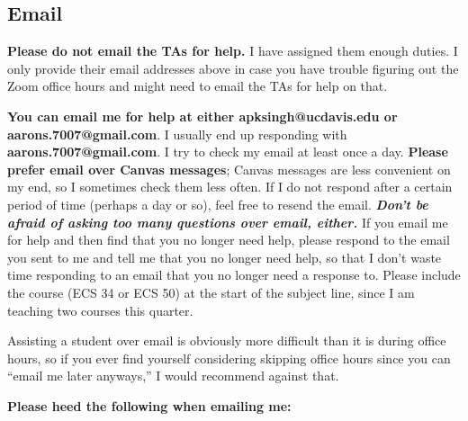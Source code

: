 \documentclass{article}
\begin{document}
\subsection{Email}

\textbf{Please do not email the TAs for help.} I have assigned them enough duties. I only provide their email addresses above in case you have trouble figuring out the Zoom office hours and might need to email the TAs for help on that.

\textbf{You can email me for help at either \textbf{apksingh@ucdavis.edu} or \textbf{aarons.7007@gmail.com}}. I usually end up responding with \textbf{aarons.7007@gmail.com}. I try to check my email at least once a day. \textbf{Please prefer email over Canvas messages}; Canvas messages are less convenient on my end, so I sometimes check them less often. If I do not respond after a certain period of time (perhaps a day or so), feel free to resend the email. \textbf{\textit{Don't be afraid of asking too many questions over email, either.}} If you email me for help and then find that you no longer need help, please respond to the email you sent to me and tell me that you no longer need help, so that I don't waste time responding to an email that you no longer need a response to. Please include the course (ECS 34 or ECS 50) at the start of the subject line, since I am teaching two courses this quarter.

Assisting a student over email is obviously more difficult than it is during office hours, so if you ever find yourself considering skipping office hours since you can ``email me later anyways,'' I would recommend against that.

\textbf{Please heed the following when emailing me:}
\end{document}
